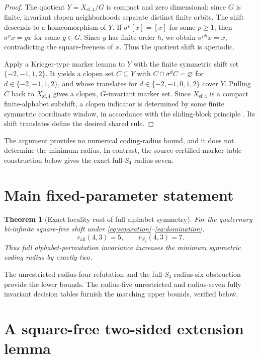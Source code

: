 \documentclass[11pt]{article}
\newtheorem{theorem}{Theorem}
\theoremstyle{remark}
\newcommand{\Xsf}{X_{\mathrm{sf},4}}
\newcommand{\Sym}{S_4}
\begin{document}
\begin{proof}
The quotient $Y=\Xsf/G$ is compact and zero dimensional: since $G$
is finite, invariant clopen neighborhoods separate distinct
finite orbits. The shift descends to a homeomorphism of $Y$.
If $\sigma^p[x]=[x]$ for some $p\ge1$, then
$\sigma^p x=gx$ for some $g\in G$. Since $g$ has finite order
$h$, we obtain $\sigma^{ph}x=x$, contradicting the
square-freeness of $x$. Thus the quotient shift is aperiodic.

Apply a Krieger-type marker lemma
\cite[Lemma 3.4]{meyerovitch2025embedding} to $Y$
with the finite symmetric shift set $\{-2,-1,1,2\}$.
It yields a clopen set $C\subseteq Y$ with
$C\cap\sigma^d C=\varnothing$ for $d\in\{-2,-1,1,2\}$,
and whose translates for $d\in\{-2,-1,0,1,2\}$ cover
$Y$. Pulling $C$ back to $\Xsf$ gives
a clopen, $G$-invariant marker set. Since $\Xsf$ is a
compact finite-alphabet subshift, a clopen indicator is
determined by some finite symmetric coordinate window,
in accordance with the sliding-block principle
\cite{hedlund1969codes}.
Its shift translates define the desired shared rule.
\end{proof}

The argument provides no numerical coding-radius bound,
and it does not determine the minimum radius. In contrast,
the source-certified marker-table construction below gives
the exact full-$S_4$ radius seven.

\section{Main fixed-parameter statement}

\begin{theorem}[Exact locality cost of full alphabet symmetry]
\label{thm:main}
For the quaternary bi-infinite square-free shift
under \eqref{eq:separation}--\eqref{eq:domination},
\[
 \boxed{r_{\mathrm{all}}(4,3)=5,\qquad
        r_{\Sym}(4,3)=7.}
\]
Thus full alphabet-permutation invariance increases
the minimum symmetric coding radius by exactly two.
\end{theorem}
The unrestricted radius-four refutation and
the full-$S_4$ radius-six obstruction provide
the lower bounds. The radius-five unrestricted
and radius-seven fully invariant decision tables
furnish the matching upper bounds, verified below.

\section{A square-free two-sided extension lemma}
\end{document}
